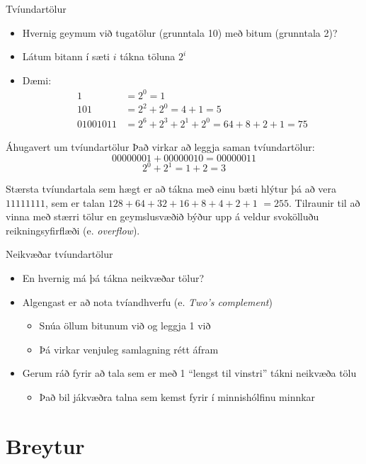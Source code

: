 \documentclass{beamer}
\begin{document}
\begin{frame}{Tvíundartölur}
\begin{itemize}
 \item Hvernig geymum við tugatölur (grunntala 10) með bitum (grunntala 2)? \pause
 \item Látum bitann í sæti $i$ tákna töluna $2^i$
 \item Dæmi:
\begin{align*}
1 		&=  2^0  	= 1\\
101		&=  2^2 + 2^0  =  4 + 1  =  5\\
01001011	&=  2^6 + 2^3 + 2^1 + 2^0  =  64 + 8 + 2 + 1 = 75
\end{align*}
\end{itemize}
\end{frame}

\begin{frame}{Áhugavert um tvíundartölur}
Það virkar að leggja saman tvíundartölur: 
\[
  00000001 + 00000010 = 00000011
\]
\[
 2^0 + 2^1 = 1 + 2 = 3
\]

Stærsta tvíundartala sem hægt er að tákna með einu bæti hlýtur þá að vera $11111111$, sem er talan $128+64+32+16+8+4+2+1$  $=  255$. Tilraunir til að vinna með stærri tölur en geymslusvæðið býður upp á veldur svokölluðu reikningsyfirflæði (e. \emph{overflow}).
\end{frame}

\begin{frame}{Neikvæðar tvíundartölur}
\begin{itemize}
 \item En hvernig má þá tákna neikvæðar tölur? \pause
 \item Algengast er að nota tvíandhverfu (e. \emph{Two's complement})
 \begin{itemize}
  \item Snúa öllum bitunum við og leggja 1 við
  \item Þá virkar venjuleg samlagning rétt áfram
 \end{itemize}
 \item Gerum ráð fyrir að tala sem er með 1 ``lengst til vinstri'' tákni neikvæða tölu
 \begin{itemize}
  \item Það bil jákvæðra talna sem kemst fyrir í minnishólfinu minnkar
 \end{itemize}
\end{itemize}
\end{frame}

\section{Breytur}
\end{document}
